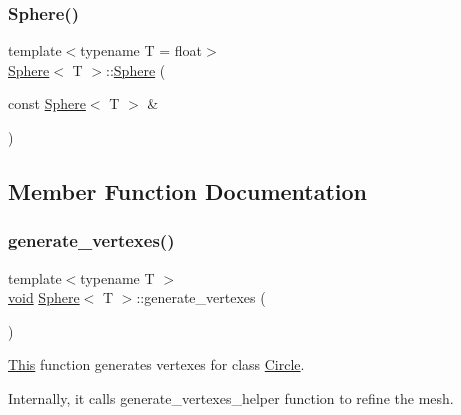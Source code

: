 \mbox{\label{classSphere_ae28ad7649c59d653b9e14a3042d186a1}} 
\subsubsection{\texorpdfstring{Sphere()}{Sphere()}\hspace{0.1cm}{\footnotesize\ttfamily [4/4]}}
{\footnotesize\ttfamily template$<$typename T = float$>$ \\
\mbox{\hyperlink{classSphere}{Sphere}}$<$ T $>$\+::\mbox{\hyperlink{classSphere}{Sphere}} (\begin{DoxyParamCaption}\item[{const \mbox{\hyperlink{classSphere}{Sphere}}$<$ T $>$ \&}]{ }\end{DoxyParamCaption})\hspace{0.3cm}{\ttfamily [default]}}



\subsection{Member Function Documentation}
\mbox{\label{classSphere_a9cfac85b9803fadc4b79db0ea047f679}} 
\subsubsection{\texorpdfstring{generate\+\_\+vertexes()}{generate\_vertexes()}}
{\footnotesize\ttfamily template$<$typename T $>$ \\
\mbox{\hyperlink{glad_8h_a950fc91edb4504f62f1c577bf4727c29}{void}} \mbox{\hyperlink{classSphere}{Sphere}}$<$ T $>$\+::generate\+\_\+vertexes (\begin{DoxyParamCaption}{ }\end{DoxyParamCaption})\hspace{0.3cm}{\ttfamily [private]}}



\mbox{\hyperlink{classThis}{This}} function generates vertexes for class \mbox{\hyperlink{classCircle}{Circle}}. 

Internally, it calls generate\+\_\+vertexes\+\_\+helper function to refine the mesh. \mbox{\label{classSphere_a84a45f41ca9e630beb97fc106b359ffd}} 

